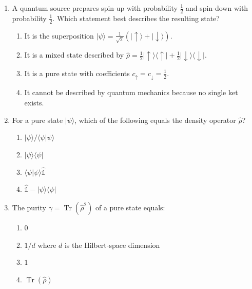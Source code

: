 \documentclass[11pt,a4paper]{article}
\begin{document}
\begin{tcolorbox}[ugconceptbox, title={Part I --- Multiple Choice \hfill\normalfont 4 questions $\times$ 2 pts = 8 pts}]

\begin{enumerate}[leftmargin=1.8em, label=\textbf{Q\arabic*.}, itemsep=10pt]

\item {}
  A quantum source prepares spin-up with probability $\tfrac{1}{2}$ and spin-down
  with probability $\tfrac{1}{2}$. Which statement best describes the resulting state?

  \begin{enumerate}[label=(\Alph*), itemsep=2pt]
    \item It is the superposition $|\psi\rangle=\tfrac{1}{\sqrt{2}}(|\uparrow\rangle+|\downarrow\rangle)$.
    \item It is a mixed state described by $\hat{\rho}=\tfrac{1}{2}|\uparrow\rangle\langle\uparrow|+\tfrac{1}{2}|\downarrow\rangle\langle\downarrow|$.
    \item It is a pure state with coefficients $c_\uparrow=c_\downarrow=\tfrac{1}{2}$.
    \item It cannot be described by quantum mechanics because no single ket exists.
  \end{enumerate}

\item {}
  For a pure state $|\psi\rangle$, which of the following equals the density operator $\hat{\rho}$?

  \begin{enumerate}[label=(\Alph*), itemsep=2pt]
    \item $|\psi\rangle/\langle\psi|\psi\rangle$
    \item $|\psi\rangle\langle\psi|$
    \item $\langle\psi|\psi\rangle\hat{\mathbb{1}}$
    \item $\hat{\mathbb{1}}-|\psi\rangle\langle\psi|$
  \end{enumerate}

\item {}
  The purity $\gamma=\operatorname{Tr}(\hat{\rho}^2)$ of a pure state equals:

  \begin{enumerate}[label=(\Alph*), itemsep=2pt]
    \item $0$
    \item $1/d$ where $d$ is the Hilbert-space dimension
    \item $1$
    \item $\operatorname{Tr}(\hat{\rho})$
  \end{enumerate}


\end{enumerate}
\end{tcolorbox}
\end{document}
